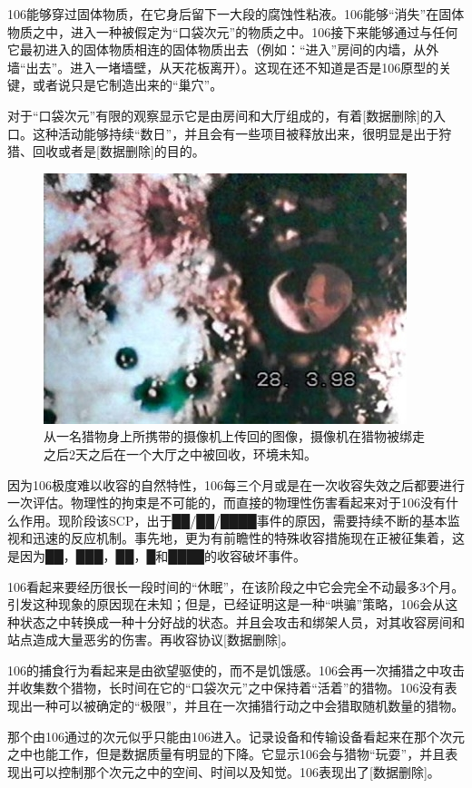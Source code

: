 106能够穿过固体物质，在它身后留下一大段的腐蚀性粘液。106能够“消失”在固体物质之中，进入一种被假定为“口袋次元”的物质之中。106接下来能够通过与任何它最初进入的固体物质相连的固体物质出去（例如：“进入”房间的内墙，从外墙“出去”。进入一堵墙壁，从天花板离开）。这现在还不知道是否是106原型的关键，或者说只是它制造出来的“巢穴”。

对于“口袋次元”有限的观察显示它是由房间和大厅组成的，有着{[}数据删除]的入口。这种活动能够持续“数日”，并且会有一些项目被释放出来，很明显是出于狩猎、回收或者是{[}数据删除]的目的。

\begin{figure}[H]
    \centering
    \includegraphics[width=0.5\linewidth]{images/SCP-106-3.jpg}
    \caption*{从一名猎物身上所携带的摄像机上传回的图像，摄像机在猎物被绑走之后2天之后在一个大厅之中被回收，环境未知。}
\end{figure}

\hr



因为106极度难以收容的自然特性，106每三个月或是在一次收容失效之后都要进行一次评估。物理性的拘束是不可能的，而直接的物理性伤害看起来对于106没有什么作用。现阶段该SCP，出于██\slash ██\slash ████事件的原因，需要持续不断的基本监视和迅速的反应机制。事先地，更为有前瞻性的特殊收容措施现在正被征集着，这是因为██，███，██，█和████的收容破坏事件。


106看起来要经历很长一段时间的“休眠”，在该阶段之中它会完全不动最多3个月。引发这种现象的原因现在未知；但是，已经证明这是一种“哄骗”策略，106会从这种状态之中转换成一种十分好战的状态。并且会攻击和绑架人员，对其收容房间和站点造成大量恶劣的伤害。再收容协议{[}数据删除]。

106的捕食行为看起来是由欲望驱使的，而不是饥饿感。106会再一次捕猎之中攻击并收集数个猎物，长时间在它的“口袋次元”之中保持着“活着”的猎物。106没有表现出一种可以被确定的“极限”，并且在一次捕猎行动之中会猎取随机数量的猎物。

那个由106通过的次元似乎只能由106进入。记录设备和传输设备看起来在那个次元之中也能工作，但是数据质量有明显的下降。它显示106会与猎物“玩耍”，并且表现出可以控制那个次元之中的空间、时间以及知觉。106表现出了{[}数据删除]。

